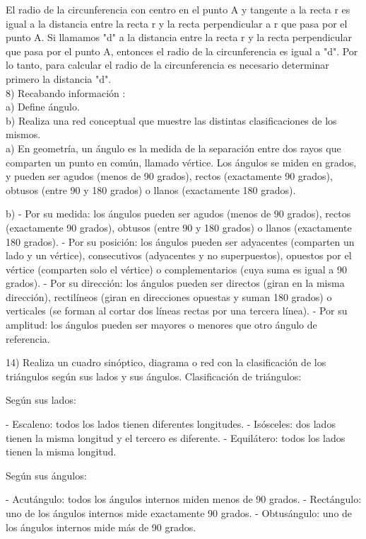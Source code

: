\documentclass{article}
\begin{document}
El radio de la circunferencia con centro en el punto A y tangente a la recta r es igual a la distancia entre la recta r y la recta perpendicular a r que pasa por el punto A. Si llamamos "d" a la distancia entre la recta r y la recta perpendicular que pasa por el punto A, entonces el radio de la circunferencia es igual a "d". Por lo tanto, para calcular el radio de la circunferencia es necesario determinar primero la distancia "d". \\

8) Recabando información :\\
a) Define ángulo.\\
b) Realiza una red conceptual que muestre las distintas clasificaciones de los mismos.\\

a)  En geometría, un ángulo es la medida de la separación entre dos rayos que comparten un punto en común, llamado vértice. Los ángulos se miden en grados, y pueden ser agudos (menos de 90 grados), rectos (exactamente 90 grados), obtusos (entre 90 y 180 grados) o llanos (exactamente 180 grados).

b) - Por su medida: los ángulos pueden ser agudos (menos de 90 grados), rectos (exactamente 90 grados), obtusos (entre 90 y 180 grados) o llanos (exactamente 180 grados).
- Por su posición: los ángulos pueden ser adyacentes (comparten un lado y un vértice), consecutivos (adyacentes y no superpuestos), opuestos por el vértice (comparten solo el vértice) o complementarios (cuya suma es igual a 90 grados).
- Por su dirección: los ángulos pueden ser directos (giran en la misma dirección), rectilíneos (giran en direcciones opuestas y suman 180 grados) o verticales (se forman al cortar dos líneas rectas por una tercera línea).
- Por su amplitud: los ángulos pueden ser mayores o menores que otro ángulo de referencia.

14) Realiza un cuadro sinóptico, diagrama o red con la clasificación de los triángulos según sus lados y sus ángulos.
Clasificación de triángulos:

Según sus lados:

- Escaleno: todos los lados tienen diferentes longitudes.
- Isósceles: dos lados tienen la misma longitud y el tercero es diferente.
- Equilátero: todos los lados tienen la misma longitud.

Según sus ángulos:

- Acutángulo: todos los ángulos internos miden menos de 90 grados.
- Rectángulo: uno de los ángulos internos mide exactamente 90 grados.
- Obtusángulo: uno de los ángulos internos mide más de 90 grados.
\end{document}
